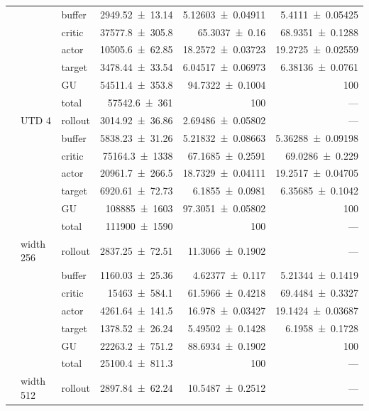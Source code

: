 {\begin{longtable}{@{}lllrrr@{}}
     &  & buffer & \num{2949.52+-13.14} & \num{5.12603+-0.04911} & \num{5.4111+-0.05425} \\
     &  & critic & \num{37577.8+-305.8} & \num{65.3037+-0.16} & \num{68.9351+-0.1288} \\
     &  & actor & \num{10505.6+-62.85} & \num{18.2572+-0.03723} & \num{19.2725+-0.02559} \\
     &  & target & \num{3478.44+-33.54} & \num{6.04517+-0.06973} & \num{6.38136+-0.0761} \\
     &  & GU & \num{54511.4+-353.8} & \num{94.7322+-0.1004} & 100 \\
     &  & total & \num{57542.6+-361} & \num{100} & --- \\
    \addlinespace[2pt]
     & UTD 4 & rollout & \num{3014.92+-36.86} & \num{2.69486+-0.05802} & --- \\
     &  & buffer & \num{5838.23+-31.26} & \num{5.21832+-0.08663} & \num{5.36288+-0.09198} \\
     &  & critic & \num{75164.3+-1338} & \num{67.1685+-0.2591} & \num{69.0286+-0.229} \\
     &  & actor & \num{20961.7+-266.5} & \num{18.7329+-0.04111} & \num{19.2517+-0.04705} \\
     &  & target & \num{6920.61+-72.73} & \num{6.1855+-0.0981} & \num{6.35685+-0.1042} \\
     &  & GU & \num{108885+-1603} & \num{97.3051+-0.05802} & 100 \\
     &  & total & \num{111900+-1590} & \num{100} & --- \\
    \addlinespace[2pt]
     & width 256 & rollout & \num{2837.25+-72.51} & \num{11.3066+-0.1902} & --- \\
     &  & buffer & \num{1160.03+-25.36} & \num{4.62377+-0.117} & \num{5.21344+-0.1419} \\
     &  & critic & \num{15463+-584.1} & \num{61.5966+-0.4218} & \num{69.4484+-0.3327} \\
     &  & actor & \num{4261.64+-141.5} & \num{16.978+-0.03427} & \num{19.1424+-0.03687} \\
     &  & target & \num{1378.52+-26.24} & \num{5.49502+-0.1428} & \num{6.1958+-0.1728} \\
     &  & GU & \num{22263.2+-751.2} & \num{88.6934+-0.1902} & 100 \\
     &  & total & \num{25100.4+-811.3} & \num{100} & --- \\
    \addlinespace[2pt]
     & width 512 & rollout & \num{2897.84+-62.24} & \num{10.5487+-0.2512} & --- \\

\end{longtable}}

